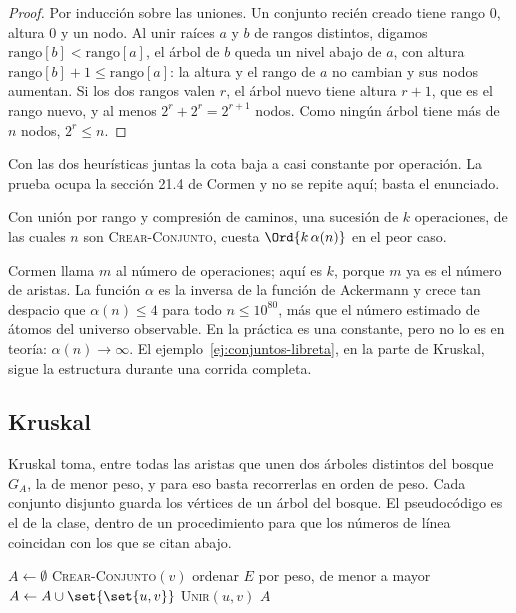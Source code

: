 \documentclass[11pt,letterpaper]{article}
\begin{document}
\begin{proof}
  Por inducción sobre las uniones. Un conjunto recién creado tiene
  rango $0$, altura $0$ y un nodo. Al unir raíces $a$ y $b$ de rangos
  distintos, digamos $\text{rango}[b] < \text{rango}[a]$, el árbol de
  $b$ queda un nivel abajo de $a$, con altura
  $\text{rango}[b] + 1 \le \text{rango}[a]$: la altura y el rango de
  $a$ no cambian y sus nodos aumentan. Si los dos rangos valen $r$, el
  árbol nuevo tiene altura $r + 1$, que es el rango nuevo, y al menos
  $2^r + 2^r = 2^{r+1}$ nodos. Como ningún árbol tiene más de $n$
  nodos, $2^r \le n$.
\end{proof}

Con las dos heurísticas juntas la cota baja a casi constante por
operación. La prueba ocupa la sección 21.4 de Cormen y no se repite
aquí; basta el enunciado.

\begin{teorema}
  \label{teo:cota-conjuntos}
  Con unión por rango y compresión de caminos, una sucesión de $k$
  operaciones, de las cuales $n$ son \textsc{Crear-Conjunto}, cuesta
  $\Ord{k\,\alpha(n)}$ en el peor caso.
\end{teorema}

Cormen llama $m$ al número de operaciones; aquí es $k$, porque $m$ ya
es el número de aristas. La función $\alpha$ es la inversa de la
función de Ackermann y crece tan despacio que $\alpha(n) \le 4$ para
todo $n \le 10^{80}$, más que el número estimado de átomos del
universo observable. En la práctica es una constante, pero no lo es
en teoría: $\alpha(n) \to \infty$. El ejemplo~\ref{ej:conjuntos-libreta},
en la parte de Kruskal, sigue la estructura durante una corrida
completa.


\subsection*{Kruskal}

Kruskal toma, entre todas las aristas que unen dos árboles distintos
del bosque $G_A$, la de menor peso, y para eso basta recorrerlas en
orden de peso. Cada conjunto disjunto guarda los vértices de un árbol
del bosque. El pseudocódigo es el de la clase, dentro de un
procedimiento para que los números de línea coincidan con los que se
citan abajo.

\begin{algorithm}[H]
\caption{\textsc{MST-Kruskal}$(G, w)$}
\label{alg:mst-kruskal}
\begin{algorithmic}[1]
  \State $A \gets \emptyset$
    \State \textsc{Crear-Conjunto}$(v)$
  \EndFor
  \State ordenar $E$ por peso, de menor a mayor
      \State $A \gets A \cup \set{\set{u, v}}$
      \State \textsc{Unir}$(u, v)$
    \EndIf
  \EndFor
  \State \Return $A$
\EndProcedure
\end{algorithmic}
\end{algorithm}
\end{document}
